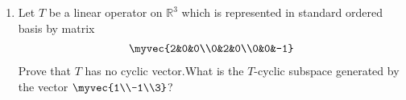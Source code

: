 \renewcommand{\theequation}{\theenumi}
\renewcommand{\thefigure}{\theenumi}
\begin{enumerate}[label=\thesubsection.\arabic*.,ref=\thesubsection.\theenumi]

\item  Let $T$ be a linear operator on $\mathbb{R}^3$ which is represented in standard ordered basis by matrix\\
\begin{align}
    \myvec{2&0&0\\0&2&0\\0&0&-1}
\end{align}
Prove that $T$ has no cyclic vector.What is the $T$-cyclic subspace generated by the vector $\myvec{1\\-1\\3}$?\\ 
\solution

\end{enumerate}
